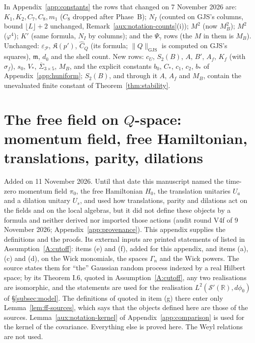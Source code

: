 \documentclass[11pt,a4paper]{article}
\theoremstyle{plain}
\theoremstyle{definition}
\theoremstyle{plain}
\theoremstyle{definition}
\newcommand{\R}{\mathbb{R}}
\newcommand{\GJS}[1]{\lVert #1\rVert_{\mathrm{GJS}}}   %
\begin{document}
In Appendix~\ref{app:constants} the rows that changed on 7 November 2026 are: $K_1,K_2,C_7,C_8,m_1$ ($C_8$ dropped after Phase~B); $N_I$ (counted on GJS's columns, bound
$\lfloor L\rfloor+2$ unchanged, Remark~\ref{aux:notation-counts}(i)); $M^2$ (now $M_B^2$); $M^2$
($\varphi^4$); $K'$ (same formula, $N_I$ by columns); and the $\Psi_\gamma$ rows (the $M$ in them
is $M_B$).  Unchanged: $\varepsilon_{\mathscr P}$, $\mathfrak K(p')$, $\widehat C_Q$ (its formula;
$\GJS Q$ is computed on GJS's squares), $\mathfrak m$, $d_0$ and the shell count.  New rows: $c_U$,
$S_2(B)$, $A$, $B'$, $A_f$, $K_f$ (with $\sigma_f$), $s_0$, $V_*$, $\overline\Sigma_{3\times5}$,
$M_B$, and the explicit constants $b_0$, $C_*$, $c_1$, $c_2$, $b_*$ of Appendix~\ref{app:huniform}; $S_2(B)$, and through it $A$, $A_f$ and $M_B$, contain the unevaluated finite constant of
Theorem~\ref{thm:stability}.

\section{The free field on \texorpdfstring{$Q$}{Q}-space: momentum field, free Hamiltonian,
translations, parity, dilations}\label{app:freefield}

Added on 11 November 2026.  Until that date this manuscript named the time-zero momentum field
$\pi_0$, the free Hamiltonian $H_0$, the translation unitaries $U_a$ and a dilation unitary
$U_s$, and used how translations, parity and dilations act on the fields and on the local
algebras, but it did not define these objects by a formula and neither derived nor imported
those actions (audit round V4f of 9 November 2026; Appendix~\ref{app:provenance}).  This
appendix supplies the definitions and the proofs.  Its external inputs are printed statements
of \cite{SimonBook} listed in Assumption~\ref{A:cutoff}: items (e) and (f), added for this
appendix, and items (a), (c) and (d), on the Wick monomials, the spaces $\Gamma_n$ and the Wick
powers.  The source states them for ``the'' Gaussian random process indexed by a real Hilbert
space; by its Theorem I.6, quoted in Assumption~\ref{A:cutoff}, any two realisations are
isomorphic, and the statements are used for the realisation $L^2(\mathcal S'(\R),d\phi_0)$ of
\S\ref{subsec:model}.  The definitions of \cite{GJ2} quoted in item (g) there enter only
Lemma~\ref{lem:ff-sources}, which says that the objects defined here are those of the sources.
Lemma~\ref{aux:notation-kernel} of Appendix~\ref{app:comparison} is used for the kernel of the
covariance.  Everything else is proved here.  The Weyl relations are not used.
\end{document}
